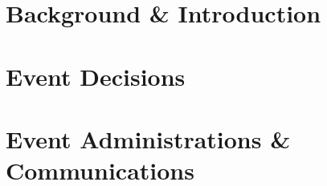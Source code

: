 \documentclass[a4paper, 11pt]{report}
\begin{document}
\makeDocumentTitle

\tableofcontents


\part{Background \& Introduction}
    
    
    
\part{Event Decisions}
    
    
    
    
    
    
    
\part{Event Administrations \& Communications}
    
    
\end{document}
